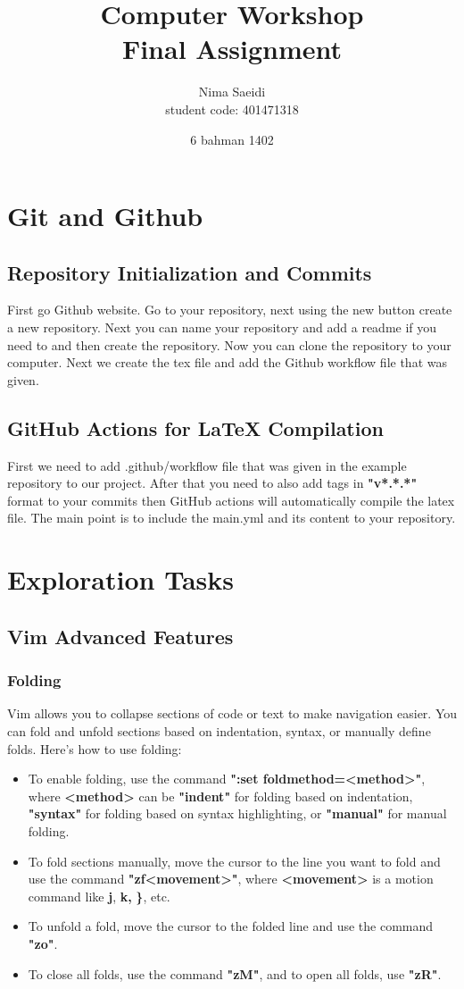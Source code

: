 \documentclass[titlepage]{article}
\title{\textbf{Computer Workshop\\ Final Assignment}}
\author{Nima Saeidi \\ student code: 401471318}
\date{6 bahman 1402}
\begin{document}
\maketitle
\tableofcontents

\newpage

\section{Git and Github}
\subsection{Repository Initialization and Commits}
First go Github website. Go to your repository, next using the new button create a new repository. Next you can name your repository and add a readme if you need to and then create the repository. Now you can clone the repository to your computer. Next we create the tex file and add the Github workflow file that was given.

\subsection{GitHub Actions for LaTeX Compilation}
First we need to add .github/workflow file that was given in the example repository to our project. After that you need to also add tags in \textbf{"v*.*.*"} format to your commits then GitHub actions will automatically compile the latex file. The main point is to include the main.yml and its content to your repository.


\section{Exploration Tasks}
\subsection{Vim Advanced Features}
\subsubsection{Folding}
Vim allows you to collapse sections of code or text to make navigation easier. You can fold and unfold sections based on indentation, syntax, or manually define folds. Here's how to use folding:

\begin{itemize}
\item To enable folding, use the command \textbf{":set foldmethod=<method>"}, where \textbf{<method>} can be \textbf{"indent"} for folding based on indentation, \textbf{"syntax"} for folding based on syntax highlighting, or \textbf{"manual"} for manual folding.
\item To fold sections manually, move the cursor to the line you want to fold and use the command \textbf{"zf<movement>"}, where \textbf{<movement>} is a motion command like \textbf{j}, \textbf{k,} \textbf{\}}, etc.
\item To unfold a fold, move the cursor to the folded line and use the command \textbf{"zo"}.
\item To close all folds, use the command \textbf{"zM"}, and to open all folds, use \textbf{"zR"}.
\end{itemize}
\end{document}
